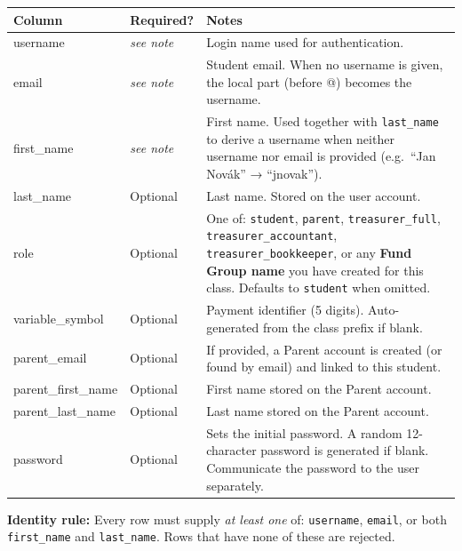 \documentclass[a4paper,11pt]{article}
\begin{document}
\bigskip
\begin{longtable}{>{\ttfamily}p{4cm} p{2cm} p{7.5cm}}
\toprule
\normalfont Column & Required? & Notes \\
\midrule
\endhead
username           & \textit{see note} & Login name used for authentication. \\
email              & \textit{see note} & Student email. When no username is given,
                                         the local part (before @) becomes the username. \\
first\_name        & \textit{see note} & First name. Used together with \texttt{last\_name}
                                         to derive a username when neither username nor email
                                         is provided (e.g.\ ``Jan Novák'' → ``jnovak''). \\
last\_name         & Optional  & Last name. Stored on the user account. \\
role               & Optional  & One of: \texttt{student}, \texttt{parent},
                                  \texttt{treasurer\_full}, \texttt{treasurer\_accountant},
                                  \texttt{treasurer\_bookkeeper},
                                  or any \textbf{Fund Group name} you have created for this class.
                                  Defaults to \texttt{student} when omitted. \\
variable\_symbol   & Optional  & Payment identifier (5 digits).
                                  Auto-generated from the class prefix if blank. \\
parent\_email      & Optional  & If provided, a Parent account is created (or found by email)
                                  and linked to this student. \\
parent\_first\_name & Optional & First name stored on the Parent account. \\
parent\_last\_name  & Optional & Last name stored on the Parent account. \\
password           & Optional  & Sets the initial password. A random 12-character
                                  password is generated if blank.
                                  Communicate the password to the user separately. \\
\bottomrule
\end{longtable}

\noindent
\textbf{Identity rule:} Every row must supply \emph{at least one} of:
\texttt{username}, \texttt{email}, or both \texttt{first\_name} and
\texttt{last\_name}. Rows that have none of these are rejected.
\end{document}

